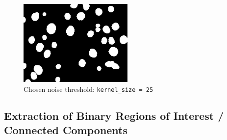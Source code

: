\documentclass[a4paper]{article}
\begin{document}
\begin{figure}[H]
    \centering
    \includegraphics[width=0.5\textwidth]{../code/task1/output/kernel_size_25.jpg}
    \caption{Chosen noise threshold: \texttt{kernel_size = 25}}
\end{figure}

\subsection{Extraction of Binary Regions of Interest / Connected Components}
\end{document}
